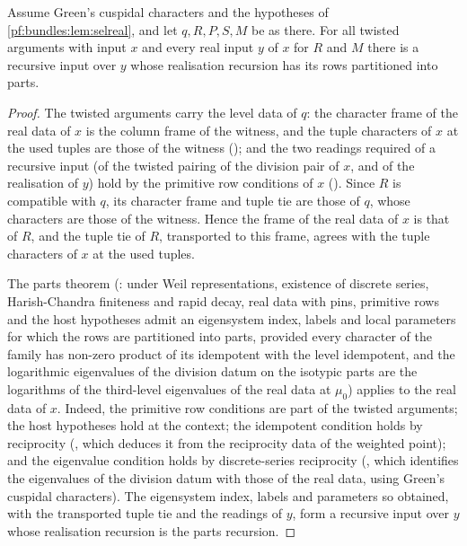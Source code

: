 \begin{lemma}\label{pf:bundles:lem:selside}
Assume Green's cuspidal characters and the hypotheses of \cref{pf:bundles:lem:selreal}, and let $q,R,P,S,M$ be as there. For all twisted
arguments with input $x$ and every real input $y$ of $x$ for $R$ and $M$ there is a recursive input over $y$ whose realisation recursion has
its rows partitioned into parts.
\end{lemma}

\begin{proof}
The twisted arguments carry the level data of $q$: the character frame of the real data of $x$ is the column frame of the witness, and the
tuple characters of $x$ at the used tuples are those of the witness (); and the two readings required
of a recursive input (of the twisted pairing of the division pair of $x$, and of the realisation of $y$) hold by the primitive row conditions of
$x$ (). Since $R$ is compatible with $q$, its character frame and tuple tie
are those of $q$, whose characters are those of the witness. Hence the frame of the real data of $x$ is that of $R$, and the tuple tie of $R$,
transported to this frame, agrees with the tuple characters of $x$ at the used tuples.

The parts theorem (: under Weil representations, existence of discrete
series, Harish-Chandra finiteness and rapid decay, real data with pins, primitive rows and the host hypotheses admit an eigensystem index, labels
and local parameters for which the rows are partitioned into parts, provided every character of the family has non-zero product of its
idempotent with the level idempotent, and the logarithmic eigenvalues of the division datum on the isotypic parts are the logarithms of the
third-level eigenvalues of the real data at $\mu_0$) applies to the real data of $x$. Indeed, the primitive row conditions are part of the
twisted arguments; the host hypotheses hold at the context; the idempotent condition holds by reciprocity
(, which deduces it from the reciprocity data of the weighted point); and the
eigenvalue condition holds by discrete-series reciprocity (, which
identifies the eigenvalues of the division datum with those of the real data, using Green's cuspidal characters). The eigensystem index,
labels and parameters so obtained, with the transported tuple tie and the readings of $y$, form a recursive input over $y$ whose realisation
recursion is the parts recursion.
\end{proof}


